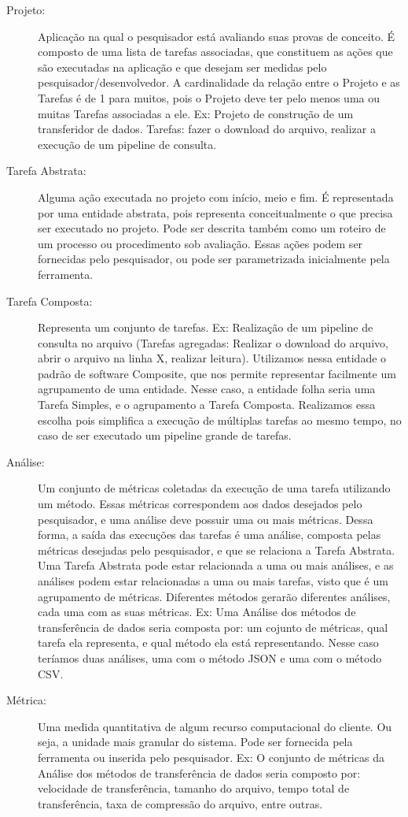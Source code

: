 \documentclass[12pt]{tcc}
\begin{document}
\begin{description}
	\item[Projeto:] Aplicação na qual o pesquisador está avaliando suas provas de conceito. É composto de uma lista de tarefas associadas, que constituem as ações que são executadas na aplicação e que desejam ser medidas pelo pesquisador/desenvolvedor. A cardinalidade da relação entre o Projeto e as Tarefas é de 1 para muitos, pois o Projeto deve ter pelo menos uma ou muitas Tarefas associadas a ele. 
	Ex: Projeto de construção de um transferidor de dados. Tarefas: fazer o download do arquivo, realizar a execução de um pipeline de consulta.
	
	\item[Tarefa Abstrata:] 
	Alguma ação executada no projeto com início, meio e fim. É representada por uma entidade abstrata, pois representa conceitualmente o que precisa ser executado no projeto. Pode ser descrita também como um roteiro de um processo ou procedimento sob avaliação. Essas ações podem ser fornecidas pelo pesquisador, ou pode ser parametrizada inicialmente pela ferramenta.

	\item[Tarefa Composta:] 
	Representa um conjunto de tarefas. Ex: Realização de um pipeline de consulta no arquivo (Tarefas agregadas: Realizar o download do arquivo, abrir o arquivo na linha X, realizar leitura).
	Utilizamos nessa entidade o padrão de software Composite, que nos permite representar facilmente um agrupamento de uma entidade. Nesse caso, a entidade folha seria uma Tarefa Simples, e o agrupamento a Tarefa Composta. Realizamos essa escolha pois simplifica a execução de múltiplas tarefas ao mesmo tempo, no caso de ser executado um pipeline grande de tarefas.

	\item[Análise:] 
	Um conjunto de métricas coletadas da execução de uma tarefa utilizando um método. Essas métricas correspondem aos dados desejados pelo pesquisador, e uma análise deve possuir uma ou mais métricas.
	Dessa forma, a saída das execuções das tarefas é uma análise, composta pelas métricas desejadas pelo pesquisador, e que se relaciona a Tarefa Abstrata. Uma Tarefa Abstrata pode estar relacionada a uma ou mais análises, e as análises podem estar relacionadas a uma ou mais tarefas, visto que é um agrupamento de métricas. Diferentes métodos gerarão diferentes análises, cada uma com as suas métricas.
	Ex: Uma Análise dos métodos de transferência de dados seria composta por: um cojunto de métricas, qual tarefa ela representa, e qual método ela está representando. Nesse caso teríamos duas análises, uma com o método JSON e uma com o método CSV.

	\item[Métrica:] 
	Uma medida quantitativa de algum recurso computacional do cliente. Ou seja, a unidade mais granular do sistema. Pode ser fornecida pela ferramenta ou inserida pelo pesquisador. Ex: O conjunto de métricas da Análise dos métodos de transferência de dados seria composto por: velocidade de transferência, tamanho do arquivo, tempo total de transferência, taxa de compressão do arquivo, entre outras.

\end{description}
\end{document}
